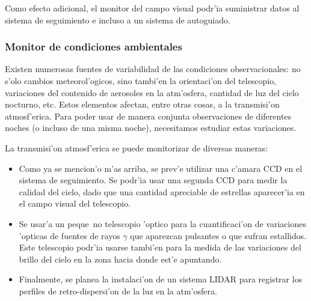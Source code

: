 Como efecto adicional, el monitor del campo visual podr'ia suministrar
datos al sistema de seguimiento e incluso a un sistema de autoguiado.

\subsubsection{Monitor de condiciones ambientales}
%
Existen numerosas fuentes de variabilidad de las condiciones
observacionales: no s'olo cambios meteorol'ogicos, sino tambi'en la
orientaci'on del telescopio, variaciones del contenido de aerosoles en
la atm'osfera, cantidad de luz del cielo nocturno, etc.  Estos
elementos afectan, entre otras cosas, a la transmisi'on atmosf'erica.
Para poder usar de manera conjunta observaciones de diferentes noches
(o incluso de una misma noche), necesitamos estudiar estas
variaciones.

La transmisi'on atmosf'erica se puede monitorizar de diversas maneras:
\begin{itemize}
\item Como ya se mencion'o m'as arriba, se prev'e utilizar una c'amara
  CCD en el sistema de seguimiento. Se podr'ia usar una segunda CCD
  para medir la calidad del cielo, dado que una cantidad apreciable de
  estrellas aparecer'ia en el campo visual del telescopio.
  
\item Se usar'a un peque~no telescopio 'optico para la cuantificaci'on
  de variaciones 'opticas de fuentes de rayos $\gamma$ que aparezcan
  pulsantes o que sufran estallidos.  Este telescopio podr'ia usarse
  tambi'en para la medida de las variaciones del brillo del cielo en
  la zona hacia donde \MAGIC est'e apuntando.
  
\item Finalmente, se planea la instalaci'on de un sistema LIDAR para
  registrar los perfiles de retro-dispersi'on de la luz en la
  atm'osfera.
\end{itemize}

%

%



\endinput
%

